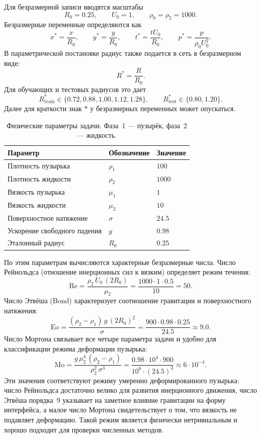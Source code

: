 \documentclass[12pt,a4paper]{article}
\newcommand{\Rbase}{R_0}
\newcommand{\Uref}{U_0}
\newcommand{\rhoref}{\rho_0}
\begin{document}
Для безразмерной записи вводятся масштабы
\[
    \Rbase=0.25,\qquad \Uref=1,\qquad \rhoref=\rho_2=1000.
\]
Безразмерные переменные определяются как
\[
    x^*=\frac{x}{\Rbase},\qquad
    y^*=\frac{y}{\Rbase},\qquad
    t^*=\frac{t\Uref}{\Rbase},\qquad
    p^*=\frac{p}{\rhoref \Uref^2}.
\]
В параметрической постановке радиус также подается в сеть в безразмерном виде:
\[
    R^*=\frac{R}{\Rbase}.
\]
Для обучающих и тестовых радиусов это дает
\[
    R^*_{\mathrm{train}}\in\{0.72,0.88,1.00,1.12,1.28\},
    \qquad
    R^*_{\mathrm{test}}\in\{0.80,1.20\}.
\]
Далее для краткости знак \(*\) у безразмерных переменных может опускаться.

\begin{table}[H]
\centering
\caption{Физические параметры задачи. Фаза~1 --- пузырёк, фаза~2 --- жидкость.}
\label{tab:params}
\begin{tabular}{lll}
\hline
Параметр & Обозначение & Значение \\
\hline
Плотность пузырька   & $\rho_1$ & $100$ \\
Плотность жидкости   & $\rho_2$ & $1000$ \\
Вязкость пузырька    & $\mu_1$  & $1$ \\
Вязкость жидкости    & $\mu_2$  & $10$ \\
Поверхностное натяжение & $\sigma$ & $24.5$ \\
Ускорение свободного падения & $g$ & $0.98$ \\
Эталонный радиус     & $R_0$    & $0.25$ \\
\hline
\end{tabular}
\end{table}

По этим параметрам вычисляются характерные безразмерные числа. Число Рейнольдса
(отношение инерционных сил к вязким) определяет режим течения:
\begin{equation}
    \mathrm{Re} = \frac{\rho_2\,U_0\,(2R_0)}{\mu_2}
    = \frac{1000\cdot 1\cdot 0.5}{10} = 50.
\end{equation}
Число Этвёша (Bond) характеризует соотношение гравитации и поверхностного
натяжения:
\begin{equation}
    \mathrm{Eo} = \frac{(\rho_2-\rho_1)\,g\,(2R_0)^2}{\sigma}
    = \frac{900\cdot 0.98\cdot 0.25}{24.5} \approx 9.0.
\end{equation}
Число Мортона связывает все четыре параметра задачи и удобно для классификации
режима деформации пузырька:
\begin{equation}
    \mathrm{Mo} = \frac{g\,\mu_2^4\,(\rho_2-\rho_1)}{\rho_2^2\,\sigma^3}
    = \frac{0.98\cdot 10^4\cdot 900}{10^6\cdot (24.5)^3} \approx 6\cdot 10^{-4}.
\end{equation}
Эти значения соответствуют режиму умеренно деформированного пузырька:
число Рейнольдса достаточно велико для развития инерционного движения, число
Этвёша порядка~9 указывает на заметное влияние гравитации на форму
интерфейса, а малое число Мортона свидетельствует о том, что вязкость не
подавляет деформацию. Такой режим является физически нетривиальным и хорошо
подходит для проверки численных методов.
\end{document}
